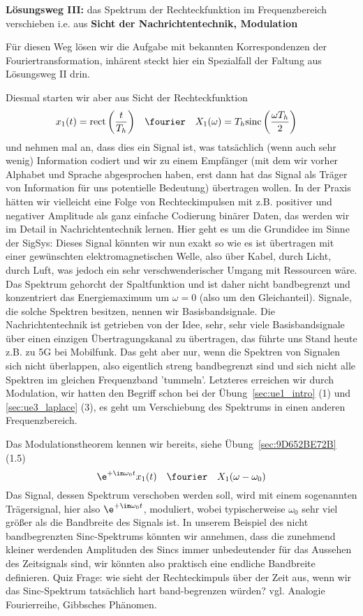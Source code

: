 \begin{ExCalc}
\textbf{Lösungsweg III:}
das Spektrum der Rechteckfunktion im Frequenzbereich verschieben
i.e. aus \textbf{Sicht der Nachrichtentechnik, Modulation}

Für diesen Weg lösen wir die Aufgabe mit bekannten Korrespondenzen der
Fouriertransformation, inhärent steckt hier ein Spezialfall der Faltung aus
Lösungsweg II drin.

Diesmal starten wir aber aus Sicht der Rechteckfunktion
\begin{align}
x_1(t) = \mathrm{rect}\left(\frac{t}{T_h}\right) &\quad \fourier \quad X_1(\omega) = T_h \mathrm{sinc}\left(\frac{\omega T_h}{2}\right)
\end{align}
und nehmen mal an, dass dies ein Signal ist, was tatsächlich (wenn auch sehr wenig)
Information codiert und wir zu einem Empfänger (mit dem wir vorher
Alphabet und Sprache abgesprochen haben,
erst dann hat das Signal als Träger von Information
für uns potentielle Bedeutung) übertragen wollen.
In der Praxis hätten wir vielleicht eine Folge von Rechteckimpulsen
mit z.B. positiver und negativer Amplitude als ganz einfache Codierung binärer
Daten, das werden wir im Detail in Nachrichtentechnik lernen. Hier geht es um die
Grundidee im Sinne der SigSys: Dieses Signal könnten wir nun exakt so wie es ist
übertragen mit einer gewünschten elektromagnetischen Welle, also über Kabel, durch Licht,
durch Luft, was jedoch ein sehr verschwenderischer Umgang mit Ressourcen wäre.
Das Spektrum gehorcht der Spaltfunktion und ist daher nicht bandbegrenzt und
konzentriert das Energiemaximum um $\omega=0$ (also um den Gleichanteil). Signale,
die solche Spektren besitzen, nennen wir Basisbandsignale.
Die Nachrichtentechnik ist getrieben von der Idee, sehr, sehr viele Basisbandsignale
über einen einzigen Übertragungskanal zu übertragen, das führte uns Stand heute
z.B. zu 5G bei Mobilfunk. Das geht aber nur, wenn die Spektren von
Signalen sich nicht überlappen, also eigentlich streng bandbegrenzt sind
und sich nicht alle Spektren im gleichen Frequenzband 'tummeln'.
Letzteres erreichen wir durch Modulation, wir hatten den Begriff schon bei der Übung~\ref{sec:ue1_intro} (1) und \ref{sec:ue3_laplace} (3),
es geht um Verschiebung des Spektrums in einen anderen Frequenzbereich.

Das Modulationstheorem kennen wir bereits, siehe Übung~\ref{sec:9D652BE72B} (1.5)
\begin{equation}
  \e^{+\im\omega_0 t} x_1(t) \quad\fourier\quad X_1(\omega-\omega_0)
\end{equation}
Das Signal, dessen Spektrum verschoben werden soll, wird mit einem sogenannten Trägersignal,
hier also $\e^{+\im\omega_0 t}$, moduliert, wobei typischerweise $\omega_0$ sehr viel größer als
die Bandbreite des Signals ist. In unserem Beispiel des nicht bandbegrenzten Sinc-Spektrums
könnten wir annehmen, dass die zunehmend kleiner werdenden Amplituden des Sincs
immer unbedeutender für das Aussehen des Zeitsignals sind, wir könnten also praktisch eine
endliche Bandbreite definieren. Quiz Frage: wie sieht der Rechteckimpuls über der Zeit aus, wenn
wir das Sinc-Spektrum tatsächlich hart band-begrenzen würden? vgl. Analogie Fourierreihe, Gibbsches Phänomen.


\end{ExCalc}
